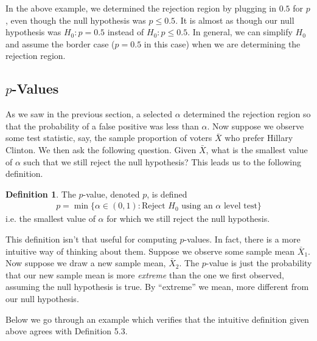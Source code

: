 \documentclass{tufte-book}
\theoremstyle{definition}
\numberwithin{theorem}{section}
\newtheorem{definition}[theorem]{Definition}
\numberwithin{definition}{section}
\numberwithin{lemma}{section}
\numberwithin{corollary}{section}
\numberwithin{proposition}{section}
\numberwithin{remark}{section}
\numberwithin{claim}{section}
\numberwithin{observation}{section}
\numberwithin{fact}{section}
\numberwithin{assumption}{section}
\numberwithin{example}{section}
\numberwithin{exercise}{section}
\begin{document}
In the above example, we determined the rejection region by plugging in $0.5$ for $p$, even though the null hypothesis was $p \leq 0.5$. It is almost as though our null hypothesis was $H_0 : p = 0.5$ instead of $H_0 : p \leq 0.5$. In general, we can simplify $H_0$ and assume the border case ($p = 0.5$ in this case) when we are determining the rejection region.

\newpage
\subsection{$p$-Values}
As we saw in the previous section, a selected $\alpha$ determined the rejection region so that the probability of a false positive was less than $\alpha$. Now suppose we observe some test statistic, say, the sample proportion of voters $\bar{X}$ who prefer Hillary Clinton. We then ask the following question. Given $\bar{X}$, what is the smallest value of $\alpha$ such that we still reject the null hypothesis? This leads us to the following definition.

\begin{definition}
The $p$-value, denoted $p$, is defined
\begin{align*}
p = \min \{\alpha \in (0,1): \text{Reject $H_0$ using an $\alpha$ level test}\}
\end{align*}
i.e. the smallest value of $\alpha$ for which we still reject the null hypothesis.
\end{definition}

This definition isn't that useful for computing $p$-values. In fact, there is a more intuitive way of thinking about them. Suppose we observe some sample mean $\bar{X}_1$. Now suppose we draw a new sample mean, $\bar{X}_2$. The $p$-value is just the probability that our new sample mean is more \textit{extreme} than the one we first observed, assuming the null hypothesis is true. By ``extreme'' we mean, more different from our null hypothesis.

Below we go through an example which verifies that the intuitive definition given above agrees with Definition 5.3.
\end{document}
